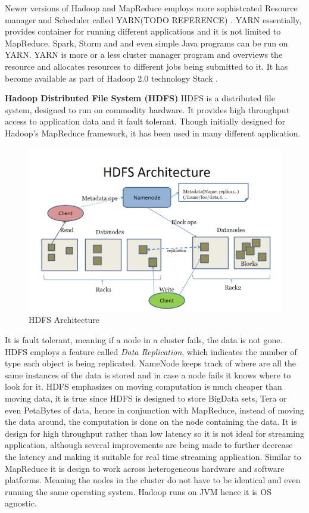\documentclass[english]{tktltiki}
\begin{document}
Newer versions of Hadoop and MapReduce employs more sophistcated Resource manager and Scheduler called YARN(TODO REFERENCE) . YARN essentially, provides container for running different applications and it is not limited to MapReduce. Spark, Storm and and even simple Java programs can be run on YARN. YARN is more or a less cluster manager program and overviews the resource and allocates resources to different jobs being submitted to it. It has become available as part of Hadoop 2.0 technology Stack .

\textbf{Hadoop Distributed File System (HDFS)}
HDFS is a distributed file system, designed to run on commodity hardware. It provides high throughput access to application data and it fault tolerant. Though initially designed for Hadoop's MapReduce framework, it has been used in many different application.
\begin{figure}[ht!]
\centering
\includegraphics[width=130mm]{figures/hdfsarchitecture.png}
\caption{HDFS Architecture}
\end{figure}

It is fault tolerant, meaning if a node in a cluster fails, the data is not gone. HDFS employs a feature called \textit{Data Replication}, which indicates the number of type each object is being replicated. NameNode keeps track of where are all the same instances of the data is stored and in case a node fails it knows where to look for it. HDFS emphasizes on moving computation is much cheaper than moving data, it is true since HDFS is designed to store BigData sets, Tera or even PetaBytes of data, hence in conjunction with MapReduce, instead of moving the data around, the computation is done on the node containing the data. It is design for high throughput  rather than low latency so it is not ideal for streaming application, although several improvements are being made to further decrease the latency and making it suitable for real time streaming application. Similar to MapReduce it is design to work across heterogeneous hardware and software platforms. Meaning the nodes in the cluster do not have to be identical and even running the same operating system. Hadoop runs on JVM hence it is OS agnostic. 
\end{document}
